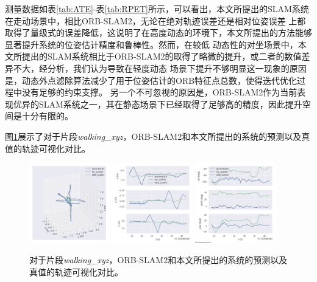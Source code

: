 测量数据如表\ref{tab:ATE}-表\ref{tab:RPET}所示，可以看出，本文所提出的SLAM系统在走动场景中，相比ORB-SLAM2，无论在绝对轨迹误差还是相对位姿误差
上都取得了量级式的误差降低，这说明了在高度动态的环境下，本文所提出的方法能够显著提升系统的位姿估计精度和鲁棒性。然而，在较低
动态性的对坐场景中，本文所提出的SLAM系统相比于ORB-SLAM2的取得了略微的提升，或二者的数值差异不大，经分析，我们认为导致在轻度动态
场景下提升不够明显这一现象的原因是，动态外点滤除算法减少了用于位姿估计的ORB特征点总数，使得迭代优化过程中没有足够的约束支撑。
另一个不可忽视的原因是，ORB-SLAM2作为当前表现优异的SLAM系统之一，其在静态场景下已经取得了足够高的精度，因此提升空间是十分有限的。

图\ref{fig:trajectory}展示了对于片段\emph{walking\_xyz}，ORB-SLAM2和本文所提出的系统的预测以及真值的轨迹可视化对比。

\begin{figure}[h]
    \centering
    \includegraphics[width=0.31\textwidth]{Img/evo1.png}
    \includegraphics[width=0.31\textwidth]{Img/evo2.png}
    \includegraphics[width=0.31\textwidth]{Img/evo3.png}
    \caption{对于片段\emph{walking\_xyz}，ORB-SLAM2和本文所提出的系统的预测以及真值的轨迹可视化对比。}
    \label{fig:trajectory}
  \end{figure}

